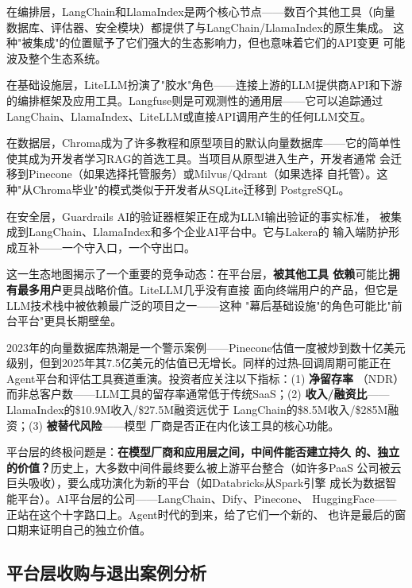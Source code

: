 在编排层，LangChain和LlamaIndex是两个核心节点——数百个其他工具（向量
数据库、评估器、安全模块）都提供了与LangChain/LlamaIndex的原生集成。
这种"被集成"的位置赋予了它们强大的生态影响力，但也意味着它们的API变更
可能波及整个生态系统。

在基础设施层，LiteLLM扮演了"胶水"角色——连接上游的LLM提供商API和下游
的编排框架及应用工具。Langfuse则是可观测性的通用层——它可以追踪通过
LangChain、LlamaIndex、LiteLLM或直接API调用产生的任何LLM交互。

在数据层，Chroma成为了许多教程和原型项目的默认向量数据库——它的简单性
使其成为开发者学习RAG的首选工具。当项目从原型进入生产，开发者通常
会迁移到Pinecone（如果选择托管服务）或Milvus/Qdrant（如果选择
自托管）。这种"从Chroma毕业"的模式类似于开发者从SQLite迁移到
PostgreSQL。

在安全层，Guardrails AI的验证器框架正在成为LLM输出验证的事实标准，
被集成到LangChain、LlamaIndex和多个企业AI平台中。它与Lakera的
输入端防护形成互补——一个守入口，一个守出口。

这一生态地图揭示了一个重要的竞争动态：在平台层，\textbf{被其他工具
依赖}可能比\textbf{拥有最多用户}更具战略价值。LiteLLM几乎没有直接
面向终端用户的产品，但它是LLM技术栈中被依赖最广泛的项目之一——这种
"幕后基础设施"的角色可能比"前台平台"更具长期壁垒。

\begin{warnbox}
2023年的向量数据库热潮是一个警示案例——Pinecone估值一度被炒到数十亿美元
级别，但到2025年其7.5亿美元的估值已无增长。同样的过热-回调周期可能正在
Agent平台和评估工具赛道重演。投资者应关注以下指标：(1) \textbf{净留存率}
（NDR）而非总客户数——LLM工具的留存率通常低于传统SaaS；(2)
\textbf{收入/融资比}——LlamaIndex的\$10.9M收入/\$27.5M融资远优于
LangChain的\$8.5M收入/\$285M融资；(3) \textbf{被替代风险}——模型
厂商是否正在内化该工具的核心功能。
\end{warnbox}

平台层的终极问题是：\textbf{在模型厂商和应用层之间，中间件能否建立持久
的、独立的价值？}历史上，大多数中间件最终要么被上游平台整合（如许多PaaS
公司被云巨头吸收），要么成功演化为新的平台（如Databricks从Spark引擎
成长为数据智能平台）。AI平台层的公司——LangChain、Dify、Pinecone、
HuggingFace——正站在这个十字路口上。Agent时代的到来，给了它们一个新的、
也许是最后的窗口期来证明自己的独立价值。

\subsection{平台层收购与退出案例分析}


